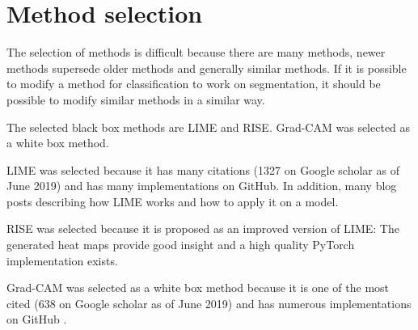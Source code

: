 \section{Method selection}
The selection of methods is difficult because there are many methods, newer methods supersede older methods and generally similar methods.
If it is possible to modify a method for classification to work on segmentation, it should be possible to modify similar methods in a similar way.

The selected black box methods are LIME and RISE. Grad-CAM was selected as a white box method.

LIME was selected because it has many citations (1327 on Google scholar as of June 2019) and has many implementations on GitHub. In addition, many blog posts describing how LIME works and how to apply it on a model.

RISE was selected because it is proposed as an improved version of LIME: The generated heat maps provide good insight and a high quality PyTorch implementation \cite{risegithub} exists.

Grad-CAM was selected as a white box method because it is one of the most cited (638 on Google scholar as of June 2019) and has numerous implementations on GitHub \cite{gradcamgithub}.
